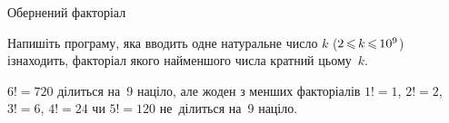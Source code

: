 \begin{problemAllDefault}{Обернений факторіал}

\myflfigaw{\hspace*{-0.5em}\begin{exampleSimple}{2em}{3em}%

\end{exampleSimple}\hspace*{-0.25em}}

Напишіть програму, яка вводить одне на\-ту\-ра\-льне число $k$ ($2\dib{{\<}}k\dib{{\<}}10^9$) і\nolinebreak[3] знаходить, факторіал якого найменшого числа кратний цьому~$k$.

\Note
$6! = 720$ ділиться на~9 націло, але жоден з менших факторіалів $1! = 1$,   $2! = 2$,   $3! = 6$,   $4! = 24$ чи $5! = 120$ не~ділиться на~9 націло.

\end{problemAllDefault}
